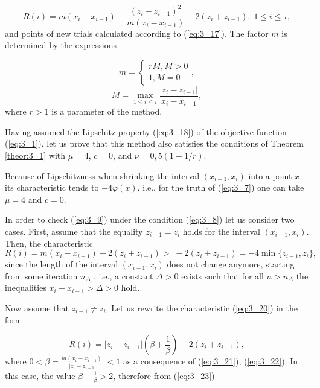 	\begin{equation}
	\label{eq:3_20}
	R(i)=m(x_{i} -x_{i-1} )+\frac{(z_{i} -z_{i-1} )^{2} }{m(x_{i} -x_{i-1} )} -2(z_{i} +z_{i-1} ),\; 1\le i\le \tau ,
	\end{equation}
	and points of new trials calculated according to  (\ref{eq:3_17}). The factor $m$ is determined by the expressions
	
	\begin{equation}
	\label{eq:3_21}
	m=\left\{\begin{array}{c} {rM,M>0} \\ {1,M=0} \end{array}\right. ,
	\end{equation}
	\begin{equation}
	\label{eq:3_22}
	M=\mathop{\max }\limits_{1\le i\le \tau } \frac{\left|z_{i} -z_{i-1} \right|}{x_{i} -x_{i-1} },
	\end{equation}
	where $r>1$ is a parameter of the method.
	
	Having assumed the Lipschitz property  (\ref{eq:3_18}) of the objective function  (\ref{eq:3_1}), let us prove that this method also satisfies the conditions of Theorem \ref{theor:3_1} with $\mu=4$, $c=0$, and $\nu =0,5(1+1/r)$.
	
	Because of Lipschitzness when shrinking the interval $(x_{i-1} ,x_{i} )$ into a point $\bar{x}$ its characteristic tends to $-4\varphi (\bar{x})$, i.e., for the truth of  (\ref{eq:3_7}) one can take $\mu=4$ and $c=0$.
	
	In order to check  (\ref{eq:3_9}) under the condition  (\ref{eq:3_8}) let us consider two cases. First, assume that the equality $z_{i-1} =z_{i} $ holds for the interval $(x_{i-1} ,x_{i} )$. Then, the characteristic
	\begin{equation*}
	R(i)=m(x_{i} -x_{i-1} )-2(z_{i} +z_{i-1} )>\; -2(z_{i} +z_{i-1} )= -4\min \{ z_{i-1} ,z_{i} \},
	\end{equation*}
	since the length of the interval $(x_{i-1} ,x_{i} )$ does not change anymore, starting from some iteration $n_{\Delta } $ , i.e., a constant $\Delta >0$ exists such that for all $n>n_{\Delta } $ the inequalities $x_{i} -x_{i-1} >\Delta >0$ hold.
	
	Now assume that $z_{i-1} \ne z_{i} $. Let us rewrite the characteristic  (\ref{eq:3_20}) in the form
	
	\begin{equation}
	\label{eq:3_23}
	R(i) = |z_{i} -z_{i-1} |(\beta +\frac{1}{\beta } )-2(z_{i} +z_{i-1} ),
	\end{equation}
	where $0<\beta =\frac{m(x_{i} -x_{i-1} )}{\; \left|z_{i} -z_{i-1} \right|} \; <1$ as a consequence of  (\ref{eq:3_21}),  (\ref{eq:3_22}). In this case, the value $\beta +\frac{1}{\beta } >2$, therefore from  (\ref{eq:3_23})
	
